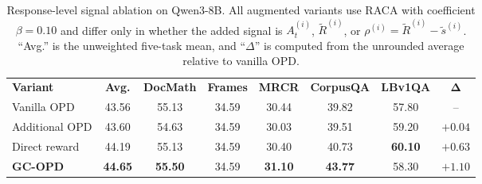 \ifdefined\GCOPDSingleColumnLayout
\begin{table}[ht]
\else
\begin{table}[ht]
\fi
\caption{Response-level signal ablation on Qwen3-8B. All augmented variants use RACA with coefficient $\beta=0.10$ and differ only in whether the added signal is $A^{(i)}_t$, $\tilde{R}^{(i)}$, or $\rho^{(i)}=\tilde{R}^{(i)}-\tilde{s}^{(i)}$. ``Avg.'' is the unweighted five-task mean, and ``$\Delta$'' is computed from the unrounded average relative to vanilla OPD.}
\label{tab:residual-signal-ablation}
\centering
\small
\setlength{\tabcolsep}{4.0pt}
\begin{tabular}{l c c c c c c c}
\toprule
\bf Variant & \bf Avg. & \bf DocMath & \bf Frames & \bf MRCR & \bf CorpusQA & \bf LBv1QA & $\boldsymbol{\Delta}$ \\
\cmidrule(lr){1-1} \cmidrule(lr){2-8}
Vanilla OPD & 43.56 & 55.13 & 34.59 & 30.44 & 39.82 & 57.80 & -- \\
Additional OPD & 43.60 & 54.63 & 34.59 & 30.03 & 39.51 & 59.20 & $+0.04$ \\
Direct reward & 44.19 & 55.13 & 34.59 & 30.40 & 40.73 & \textbf{60.10} & $+0.63$ \\
\cmidrule(lr){1-1} \cmidrule(lr){2-8}
\textbf{GC-OPD} & \textbf{44.65} & \textbf{55.50} & 34.59 & \textbf{31.10} & \textbf{43.77} & 58.30 & $\mathbf{+1.10}$ \\
\bottomrule
\end{tabular}
\ifdefined\GCOPDSingleColumnLayout
\end{table}
\else
\end{table}
\fi

